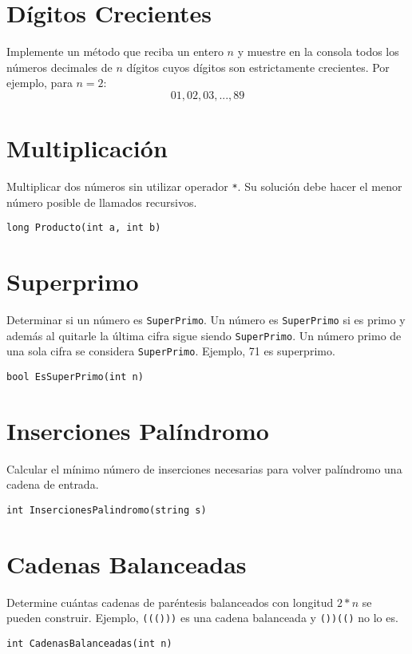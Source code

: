 \section{Dígitos Crecientes}
Implemente un método que reciba un entero \( n \) y muestre en la consola todos los números decimales de \( n \) dígitos cuyos dígitos son estrictamente crecientes. Por ejemplo, para \( n = 2 \):
\[
01, 02, 03, ..., 89
\]
        
\section{Multiplicación}
Multiplicar dos números sin utilizar operador \texttt{*}. Su solución debe hacer el menor número posible de llamados recursivos.

\begin{verbatim}
long Producto(int a, int b)
\end{verbatim}

\section{Superprimo}
Determinar si un número es \texttt{SuperPrimo}. Un número es \texttt{SuperPrimo} si es primo y además al quitarle la última cifra sigue siendo \texttt{SuperPrimo}. Un número primo de una sola cifra se considera \texttt{SuperPrimo}. Ejemplo, 71 es superprimo.

\begin{verbatim}
bool EsSuperPrimo(int n)
\end{verbatim}

\section{Inserciones Palíndromo}
Calcular el mínimo número de inserciones necesarias para volver palíndromo una cadena de entrada.

\begin{verbatim}
int InsercionesPalindromo(string s)
\end{verbatim}

\section{Cadenas Balanceadas}
Determine cuántas cadenas de paréntesis balanceados con longitud $2 * n$ se pueden construir. Ejemplo, \texttt{((()))} es una cadena balanceada y \texttt{())(()} no lo es.

\begin{verbatim}
int CadenasBalanceadas(int n)
\end{verbatim}

